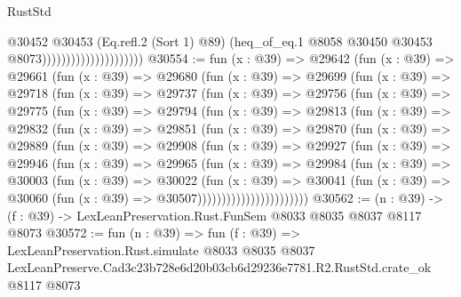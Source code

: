 \begin{lexlean}{RustStd}
\begin{coremodule}
                                          @30452
                                            @30453
                                            (Eq.refl.{2} (Sort 1) @89)
                                            (heq_of_eq.{1}
                                              @8058
                                              @30450
                                              @30453
                                              @8073)))))))))))))))))))))
@30554 := fun (x : @39) =>
  @29642
    (fun (x : @39) =>
    @29661
      (fun (x : @39) =>
      @29680
        (fun (x : @39) =>
        @29699
          (fun (x : @39) =>
          @29718
            (fun (x : @39) =>
            @29737
              (fun (x : @39) =>
              @29756
                (fun (x : @39) =>
                @29775
                  (fun (x : @39) =>
                  @29794
                    (fun (x : @39) =>
                    @29813
                      (fun (x : @39) =>
                      @29832
                        (fun (x : @39) =>
                        @29851
                          (fun (x : @39) =>
                          @29870
                            (fun (x : @39) =>
                            @29889
                              (fun (x : @39) =>
                              @29908
                                (fun (x : @39) =>
                                @29927
                                  (fun (x : @39) =>
                                  @29946
                                    (fun (x : @39) =>
                                    @29965
                                      (fun (x : @39) =>
                                      @29984
                                        (fun (x : @39) =>
                                        @30003
                                          (fun (x : @39) =>
                                          @30022
                                            (fun (x : @39) =>
                                            @30041
                                              (fun (x : @39) =>
                                              @30060 (fun (x : @39) => @30507)))))))))))))))))))))))
@30562 := (n : @39) -> (f : @39) -> LexLeanPreservation.Rust.FunSem @8033 @8035 @8037 @8117 @8073
@30572 := fun (n : @39) =>
  fun (f : @39) =>
  LexLeanPreservation.Rust.simulate
    @8033
    @8035
    @8037
    LexLeanPreserve.Cad3c23b728e6d20b03cb6d29236e7781.R2.RustStd.crate_ok
    @8117
    @8073
\end{coremodule}
\end{lexlean}
